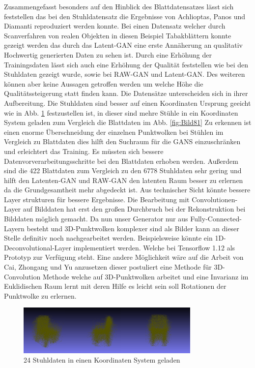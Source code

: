 \documentclass{llncs}
\begin{document}
Zusammengefasst besonders auf den Hinblick des Blattdatensatzes lässt sich feststellen das bei den Stuhldatensatz die Ergebnisse von Achlioptas, Panos und Diamanti\cite{3dgan} reproduziert werden konnte. Bei einen Datensatz welcher durch Scanverfahren von realen Objekten in diesen Beispiel Tabakblättern konnte gezeigt werden das durch das Latent-GAN eine erste Annäherung an qualitativ Hochwertig generierten Daten zu sehen ist. Durch eine Erhöhung der Trainingsdaten lässt sich auch eine Erhöhung der Qualität feststellen wie bei den Stuhldaten gezeigt wurde, sowie bei RAW-GAN und Latent-GAN. Des weiteren können aber keine Aussagen getroffen werden um welche Höhe die Qualitätssteigerung statt  finden kann. Die Datensätze unterscheiden sich in ihrer Aufbereitung. Die Stuhldaten sind besser auf einen Koordinaten Ursprung geeicht wie in Abb. \ref{fig:Bild85} festzustellen ist, in dieser sind mehre Stühle in ein Koordinaten System geladen zum Vergleich die Blattdaten im Abb. \ref{fig:Bild81} Zu erkennen ist einen enorme Überschneidung der einzelnen Punktwolken bei Stühlen im Vergleich zu Blattdaten dies hilft den Suchraum für die GANS einzuschränken und erleichtert das Training. Es müssten sich bessere Datenvorverarbeitungsschritte bei den Blattdaten erhoben werden. Außerdem sind die 422 Blattdaten zum Vergleich zu den 6778 Stuhldaten sehr gering und hilft den Latenten-GAN und RAW-GAN den latenten Raum besser zu erlernen da die Grundgesamtheit mehr abgedeckt ist. Aus technischer Sicht könnte bessere Layer strukturen für bessere Ergebnisse. Die Bearbeitung mit Convolutionen-Layer auf Bilddaten hat erst den großen Durchbruch bei der Rekonstruktion bei Bilddaten möglich gemacht\cite{imagerecon}. Da nun unser Generator nur aus Fully-Connected-Layern besteht und 3D-Punktwolken komplexer sind als Bilder kann an dieser Stelle definitiv noch nachgearbeitet werden. Beispielsweise könnte ein 1D-Deconvolutional-Layer implementiert werden. Welche bei Tensorflow 1.12 als Prototyp zur Verfügung steht. Eine andere Möglichkeit wäre auf die Arbeit von Cai, Zhongang  und Yu \cite{3d-conv} anzusetzen dieser postuliert eine Methode für 3D-Convolution Methode welche auf 3D-Punktwolken arbeitet und eine Invarianz im Euklidischen Raum lernt mit deren Hilfe es leicht sein soll Rotationen der Punktwolke zu erlernen.

\begin{figure}[htbp] 
	\centering
	\includegraphics[width=0.8\textwidth]{chair_all.png}
	\caption{24 Stuhldaten in einen Koordinaten System geladen}
	\label{fig:Bild85}
\end{figure}
\newpage
\end{document}
